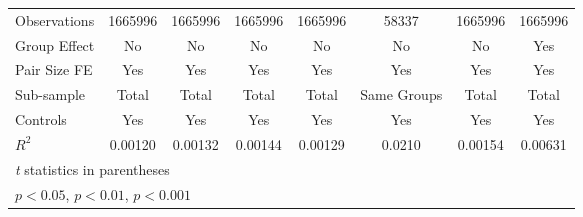 {\begin{tabular}{l*{7}{c}}
\hline
Observations    &  1665996         &  1665996         &  1665996         &  1665996         &    58337         &  1665996         &  1665996         \\
Group Effect    &       No         &       No         &       No         &       No         &       No         &       No         &      Yes         \\
Pair Size FE    &      Yes         &      Yes         &      Yes         &      Yes         &      Yes         &      Yes         &      Yes         \\
Sub-sample      &    Total         &    Total         &    Total         &    Total         &Same Groups         &    Total         &    Total         \\
Controls        &      Yes         &      Yes         &      Yes         &      Yes         &      Yes         &      Yes         &      Yes         \\
$ R^2 $         &  0.00120         &  0.00132         &  0.00144         &  0.00129         &   0.0210         &  0.00154         &  0.00631         \\
\hline\hline
\multicolumn{8}{l}{\footnotesize \textit{t} statistics in parentheses}\\
\multicolumn{8}{l}{\footnotesize \sym{*} \(p<0.05\), \sym{**} \(p<0.01\), \sym{***} \(p<0.001\)}\\
\end{tabular}
}
